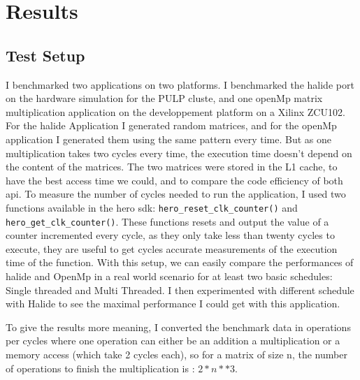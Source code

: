 
\chapter{Results}
\section{Test Setup}
	I benchmarked two applications on two platforms. I benchmarked the halide port  on the hardware simulation for the PULP cluste, and one openMp matrix multiplication application on the developpement platform on a Xilinx ZCU102. For the halide Application I generated random matrices, and for the openMp application I generated them using the same pattern every time. But as one multiplication takes two cycles every time, the execution time doesn't depend on the content of the matrices. The two matrices were stored in the L1 cache, to have the best access time we could, and to compare the code efficiency of both \gls{api}.
	To measure the number of cycles needed to run the application, I used two functions available in the hero sdk: \verb|hero_reset_clk_counter()| and \verb|hero_get_clk_counter()|. These functions resets and output the value of a counter incremented every cycle, as they only take less than twenty cycles to execute, they are useful to get cycles accurate measurements of the execution time of the function.
	With this setup, we can easily compare the performances of halide and OpenMp in a real world scenario for at least two basic schedules: Single threaded and Multi Threaded. I then experimented with different schedule with Halide to see the maximal performance I could get with this application.

	To give the results more meaning, I converted the benchmark data in operations per cycles where one operation can either be an addition a multiplication or a memory access (which take 2 cycles each), so for a matrix of size n, the number of operations to finish the multiplication is : $2 * n ** 3$.

